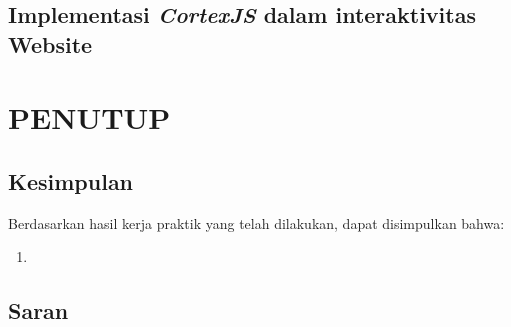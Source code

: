 \documentclass{file/KP-ITS}
\theoremstyle{definition}
\theoremstyle{definition}
\theoremstyle{plain}
\begin{document}
\section{Implementasi \textit{CortexJS} dalam interaktivitas Website}


\chapter{PENUTUP}
\section{Kesimpulan}
Berdasarkan hasil kerja praktik yang telah dilakukan, dapat disimpulkan bahwa:
\begin{enumerate}
    \item 
\end{enumerate}
\section{Saran}



\DaftarPustaka
\end{document}
